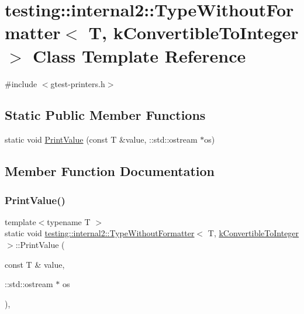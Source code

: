 \hypertarget{classtesting_1_1internal2_1_1_type_without_formatter_3_01_t_00_01k_convertible_to_integer_01_4}{}\section{testing\+::internal2\+::Type\+Without\+Formatter$<$ T, k\+Convertible\+To\+Integer $>$ Class Template Reference}
\label{classtesting_1_1internal2_1_1_type_without_formatter_3_01_t_00_01k_convertible_to_integer_01_4}


{\ttfamily \#include $<$gtest-\/printers.\+h$>$}

\subsection*{Static Public Member Functions}
\begin{DoxyCompactItemize}
\item 
static void \mbox{\hyperlink{classtesting_1_1internal2_1_1_type_without_formatter_3_01_t_00_01k_convertible_to_integer_01_4_ab27a411afb608e730a57d232b3f4f486}{Print\+Value}} (const T \&value, \+::std\+::ostream $\ast$os)
\end{DoxyCompactItemize}


\subsection{Member Function Documentation}
\mbox{\label{classtesting_1_1internal2_1_1_type_without_formatter_3_01_t_00_01k_convertible_to_integer_01_4_ab27a411afb608e730a57d232b3f4f486}} 
\subsubsection{\texorpdfstring{PrintValue()}{PrintValue()}}
{\footnotesize\ttfamily template$<$typename T $>$ \\
static void \mbox{\hyperlink{classtesting_1_1internal2_1_1_type_without_formatter}{testing\+::internal2\+::\+Type\+Without\+Formatter}}$<$ T, \mbox{\hyperlink{namespacetesting_1_1internal2_aeb8161b0b3ee503347b0662d7028fd57a9bdcf3f1548f498b2b7f097306ea0224}{k\+Convertible\+To\+Integer}} $>$\+::Print\+Value (\begin{DoxyParamCaption}\item[{const T \&}]{value,  }\item[{\+::std\+::ostream $\ast$}]{os }\end{DoxyParamCaption})\hspace{0.3cm}{\ttfamily [inline]}, {\ttfamily [static]}}



